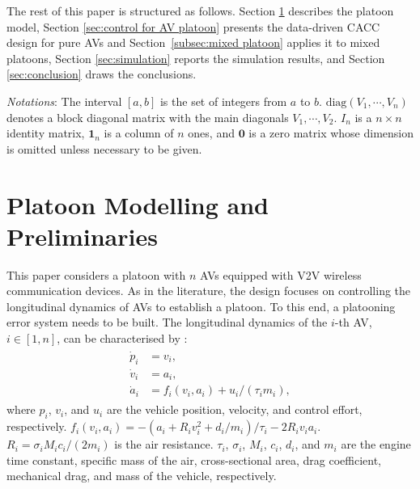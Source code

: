 \documentclass[letterpaper, 10 pt, conference]{ieeeconf}
\begin{document}
	
	The rest of this paper is structured as follows.
	Section \ref{sec:problem statement} describes the platoon model, Section \ref{sec:control for AV platoon} 
	presents the data-driven CACC design for pure AVs and Section~\ref{subsec:mixed platoon} applies it to mixed platoons, Section \ref{sec:simulation} 
	reports the simulation results, and Section \ref{sec:conclusion} draws the 
	conclusions.
	
\textit{Notations}: 
The interval $[a,b]$ is the set of integers from $a$ to $b$. $\mathrm{diag}(V_1, \cdots, V_n)$ denotes a block diagonal matrix with the main diagonals $V_1, \cdots, V_2$. 
$I_n$ is a $n \times n$ identity matrix, $\mathbf{1}_n$ is a column of $n$  ones, and $\mathbf{0}$ is a zero matrix whose dimension is omitted unless necessary to be given. 
	
	
	\section{Platoon Modelling and Preliminaries} \label{sec:problem statement}
	This paper considers a platoon with $n$ AVs 
	equipped with V2V wireless communication devices. As in the 
	literature, the design focuses on
	controlling the longitudinal dynamics of AVs to establish a platoon. To this end, a platooning error system needs to be built.
	The longitudinal dynamics of the $i$-th AV, $i \in [1,n]$, can be characterised by \cite{Ghasemi+13}:
	\begin{eqnarray}\label{eq:nonlinear vehicle dynamics}
		\begin{split}
			\dot{p}_i &= v_i, \\
			\dot{v}_i &= a_i, \\
			\dot{a}_i &= f_i(v_i,a_i) + u_i/(\tau_i m_i),
		\end{split}
	\end{eqnarray}
	where $p_i$, $v_i$, and $u_i$ are the vehicle position, velocity, and control effort, respectively.
	$f_i(v_i,a_i) = - ( a_i + R_i v_i^2 + d_i/m_i )/\tau_i - 2 R_i v_i a_i.
	$
	$R_i = \sigma_i M_i c_i/(2 m_i)$ is the air resistance.
	$\tau_i$, $\sigma_i$, $M_i$, $c_i$, $d_i$, and $m_i$ are the 
	engine time constant, specific mass of the air, cross-sectional area, drag 
	coefficient, mechanical drag, and mass of the vehicle, respectively. 
	
\end{document}
